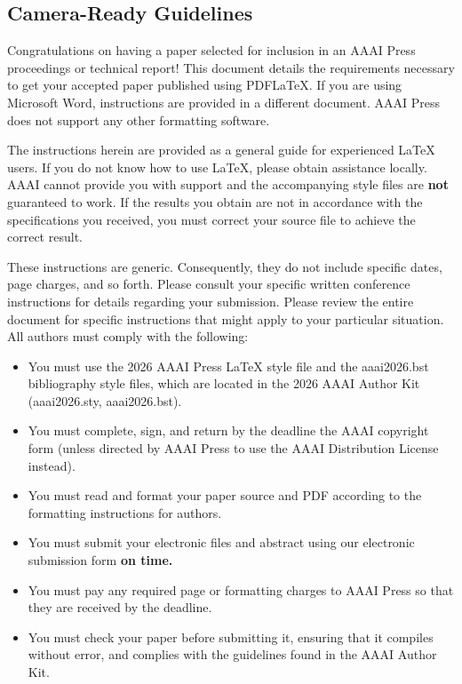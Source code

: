 \documentclass[letterpaper]{article} %
\providecommand{\tightlist}{%
  \setlength{\itemsep}{0pt}\setlength{\parskip}{0pt}}
\begin{document}
\subsection{Camera-Ready Guidelines}\label{camera-ready-guidelines}

Congratulations on having a paper selected for inclusion in an AAAI
Press proceedings or technical report! This document details the
requirements necessary to get your accepted paper published using
PDF{\LaTeX}. If you are using Microsoft Word, instructions are provided
in a different document. AAAI Press does not support any other
formatting software.

The instructions herein are provided as a general guide for experienced
{\LaTeX} users. If you do not know how to use {\LaTeX}, please obtain
assistance locally. AAAI cannot provide you with support and the
accompanying style files are \textbf{not} guaranteed to work. If the
results you obtain are not in accordance with the specifications you
received, you must correct your source file to achieve the correct
result.

These instructions are generic. Consequently, they do not include
specific dates, page charges, and so forth. Please consult your specific
written conference instructions for details regarding your submission.
Please review the entire document for specific instructions that might
apply to your particular situation. All authors must comply with the
following:

\begin{itemize}
\tightlist
\item
  You must use the 2026 AAAI Press {\LaTeX} style file and the
  aaai2026.bst bibliography style files, which are located in the 2026
  AAAI Author Kit (aaai2026.sty, aaai2026.bst).
\item
  You must complete, sign, and return by the deadline the AAAI copyright
  form (unless directed by AAAI Press to use the AAAI Distribution
  License instead).
\item
  You must read and format your paper source and PDF according to the
  formatting instructions for authors.
\item
  You must submit your electronic files and abstract using our
  electronic submission form \textbf{on time.}
\item
  You must pay any required page or formatting charges to AAAI Press so
  that they are received by the deadline.
\item
  You must check your paper before submitting it, ensuring that it
  compiles without error, and complies with the guidelines found in the
  AAAI Author Kit.
\end{itemize}
\end{document}
